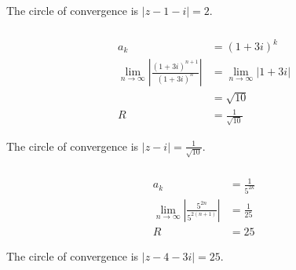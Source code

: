\documentclass{article}
\begin{document}
The circle of convergence is $|z - 1 - i| = 2$.

\setcounter{subsubsection}{24}
\subsubsection{}

\begin{align*}
  a_k                                                                              & = (1 + 3 i)^k                           \\
  \lim_{n \rightarrow \infty} \left| \frac{(1 + 3 i)^{n + 1}}{(1 + 3 i)^n} \right| & = \lim_{n \rightarrow \infty} |1 + 3 i| \\
                                                                                   & = \sqrt{10}                             \\
  R                                                                                & = \frac{1}{\sqrt{10}}
\end{align*}

The circle of convergence is $|z - i| = \frac{1}{\sqrt{10}}$.

\setcounter{subsubsection}{26}
\subsubsection{}

\begin{align*}
  a_k                                                                      & = \frac{1}{5^{2 k}} \\
  \lim_{n \rightarrow \infty} \left| \frac{5^{2 n}}{5^{2 (n + 1)}} \right| & = \frac{1}{25}      \\
  R                                                                        & = 25
\end{align*}

The circle of convergence is $|z - 4 - 3 i| = 25$.
\end{document}
